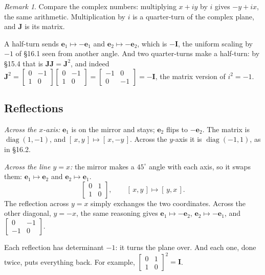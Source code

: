 \documentclass[11pt]{article}
\theoremstyle{plain}
\theoremstyle{definition}
\theoremstyle{remark}
\newtheorem*{rmk}{Remark}
\newcommand{\vc}[1]{\mathbf{#1}}
\newcommand{\mt}[1]{\mathbf{#1}}
\DeclareMathOperator{\diagop}{diag}
\begin{document}
\begin{rmk}
Compare the complex numbers: multiplying $x+iy$ by $i$ gives $-y+ix$, the same
arithmetic. Multiplication by $i$ is a quarter-turn of the complex plane, and
$\mt{J}$ is its matrix.
\end{rmk}

\noindent A half-turn sends $\vc{e}_1\mapsto-\vc{e}_1$ and $\vc{e}_2\mapsto-\vc{e}_2$,
which is $-\mt{I}$, the uniform scaling by $-1$ of \S16.1 seen from another
angle. And two quarter-turns make a half-turn: by \S15.4 that is
$\mt{J}\mt{J}=\mt{J}^{2}$, and indeed
$\mt{J}^{2}=\begin{bmatrix}0&-1\\1&0\end{bmatrix}\begin{bmatrix}0&-1\\1&0\end{bmatrix}
=\begin{bmatrix}-1&0\\0&-1\end{bmatrix}=-\mt{I}$, the matrix version of
$i^{2}=-1$.

\subsection{Reflections}
\emph{Across the $x$-axis:} $\vc{e}_1$ is on the mirror and stays;
$\vc{e}_2$ flips to $-\vc{e}_2$. The matrix is $\diagop(1,-1)$, and
$[\,x,y\,]\mapsto[\,x,-y\,]$. Across the $y$-axis it is $\diagop(-1,1)$, as in
\S16.2.

\emph{Across the line $y=x$:} the mirror makes a $45^\circ$ angle with each
axis, so it swaps them: $\vc{e}_1\mapsto\vc{e}_2$ and $\vc{e}_2\mapsto\vc{e}_1$.
\[
  \begin{bmatrix}0&1\\1&0\end{bmatrix},
  \qquad
  [\,x,y\,]\mapsto[\,y,x\,] .
\]
The reflection across $y=x$ simply exchanges the two coordinates. Across the
other diagonal, $y=-x$, the same reasoning gives
$\vc{e}_1\mapsto-\vc{e}_2$, $\vc{e}_2\mapsto-\vc{e}_1$, and
$\begin{bmatrix}0&-1\\-1&0\end{bmatrix}$.

Each reflection has determinant $-1$: it turns the plane over. And each one,
done twice, puts everything back. For example,
$\begin{bmatrix}0&1\\1&0\end{bmatrix}^{2}=\mt{I}$.
\end{document}
